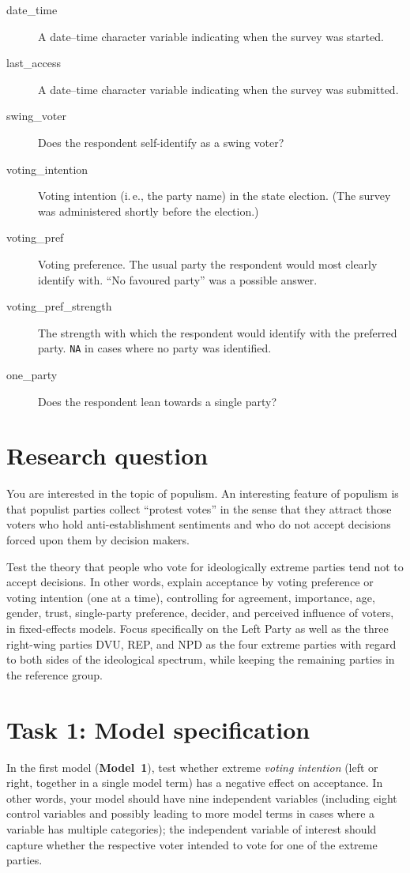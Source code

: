 \documentclass[a4paper,11pt]{article}
\begin{document}
\begin{description}
 \item[date\_time] A date--time character variable indicating when the survey was started.
 \item[last\_access] A date--time character variable indicating when the survey was submitted.
 \item[swing\_voter] Does the respondent self-identify as a swing voter?
 \item[voting\_intention] Voting intention (i.\,e., the party name) in the state election. (The survey was administered shortly before the election.)
 \item[voting\_pref] Voting preference. The usual party the respondent would most clearly identify with. ``No favoured party'' was a possible answer.
 \item[voting\_pref\_strength] The strength with which the respondent would identify with the preferred party. \texttt{NA} in cases where no party was identified.
 \item[one\_party] Does the respondent lean towards a single party?
\end{description}

\section*{Research question}
You are interested in the topic of populism. An interesting feature of populism is that populist parties collect ``protest votes'' in the sense that they attract those voters who hold anti-establishment sentiments and who do not accept decisions forced upon them by decision makers.

Test the theory that people who vote for ideologically extreme parties tend not to accept decisions. In other words, explain acceptance by voting preference or voting intention (one at a time), controlling for agreement, importance, age, gender, trust, single-party preference, decider, and perceived influence of voters, in fixed-effects models. Focus specifically on the Left Party as well as the three right-wing parties DVU, REP, and NPD as the four extreme parties with regard to both sides of the ideological spectrum, while keeping the remaining parties in the reference group.


\section*{Task 1: Model specification}
In the first model (\textbf{Model~1}), test whether extreme \emph{voting intention} (left or right, together in a single model term) has a negative effect on acceptance. In other words, your model should have nine independent variables (including eight control variables and possibly leading to more model terms in cases where a variable has multiple categories); the independent variable of interest should capture whether the respective voter intended to vote for one of the extreme parties.
\end{document}
